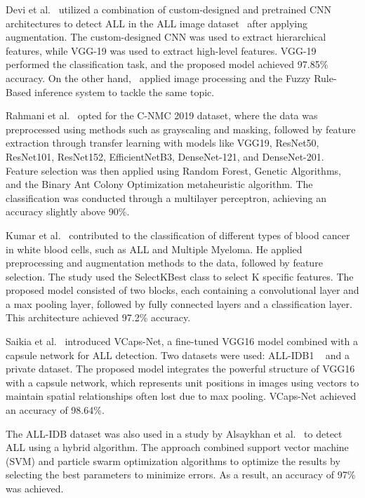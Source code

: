 Devi et al.~\cite{Devi2024} utilized a combination of custom-designed and pretrained CNN architectures to detect ALL in the ALL image dataset~\cite{Ghaderzadeh2021} after applying augmentation. The custom-designed CNN was used to extract hierarchical features, while VGG-19 was used to extract high-level features. VGG-19 performed the classification task, and the proposed model achieved 97.85\% accuracy. On the other hand,~\cite{Khosrosereshki2017} applied image processing and the Fuzzy Rule-Based inference system to tackle the same topic.

Rahmani et al.~\cite{Rahmani2024} opted for the C-NMC 2019 dataset, where the data was preprocessed using methods such as grayscaling and masking, followed by feature extraction through transfer learning with models like VGG19, ResNet50, ResNet101, ResNet152, EfficientNetB3, DenseNet-121, and DenseNet-201. Feature selection was then applied using Random Forest, Genetic Algorithms, and the Binary Ant Colony Optimization metaheuristic algorithm. The classification was conducted through a multilayer perceptron, achieving an accuracy slightly above 90\%.

Kumar et al.~\cite{Kumar2020} contributed to the classification of different types of blood cancer in white blood cells, such as ALL and Multiple Myeloma. He applied preprocessing and augmentation methods to the data, followed by feature selection. The study used the SelectKBest class to select K specific features. The proposed model consisted of two blocks, each containing a convolutional layer and a max pooling layer, followed by fully connected layers and a classification layer. This architecture achieved 97.2\% accuracy.

Saikia et al.~\cite{Saikia2024} introduced VCaps-Net, a fine-tuned VGG16 model combined with a capsule network for ALL detection. Two datasets were used: ALL-IDB1 ~\cite{Genovese2023} and a private dataset. The proposed model integrates the powerful structure of VGG16 with a capsule network, which represents unit positions in images using vectors to maintain spatial relationships often lost due to max pooling. VCaps-Net achieved an accuracy of 98.64\%.

The ALL-IDB dataset was also used in a study by Alsaykhan et al.~\cite{Alsaykhan2024} to detect ALL using a hybrid algorithm. The approach combined support vector machine (SVM) and particle swarm optimization algorithms to optimize the results by selecting the best parameters to minimize errors. As a result, an accuracy of 97\% was achieved.

